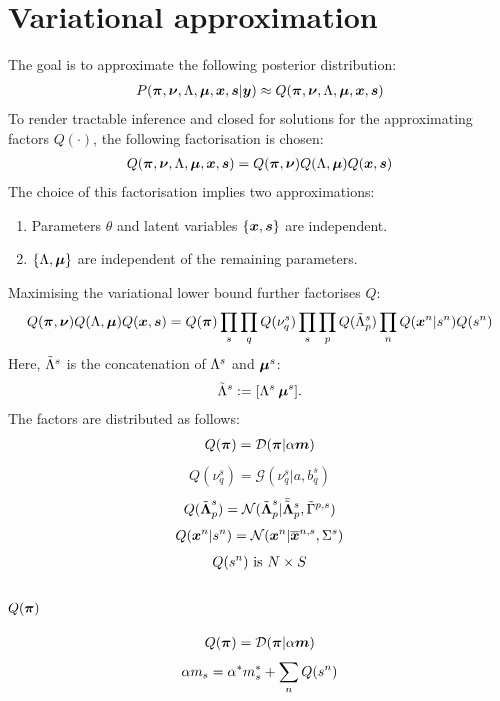 \documentclass[a4paper]{article}
\begin{document}
\section{Variational approximation}
The goal is to approximate the following posterior distribution:
\begin{align}
  P(\boldsymbol{\pi},\boldsymbol{\nu},\Lambda,\boldsymbol{\mu},\boldsymbol{x},\boldsymbol{s}|\boldsymbol{y}) \approx Q(\boldsymbol{\pi},\boldsymbol{\nu},\Lambda,\boldsymbol{\mu},\boldsymbol{x},\boldsymbol{s})
\end{align}
To render tractable inference and closed for solutions for the approximating factors $Q(\cdot)$, the following factorisation is chosen:
\begin{align}
  Q(\boldsymbol{\pi},\boldsymbol{\nu},\Lambda,\boldsymbol{\mu},\boldsymbol{x},\boldsymbol{s})=Q(\boldsymbol{\pi},\boldsymbol{\nu})Q(\Lambda,\boldsymbol{\mu})Q(\boldsymbol{x},\boldsymbol{s})
\end{align}
The choice of this factorisation implies two approximations:
\begin{enumerate}
  \item Parameters $\theta$ and latent variables $\left\{\boldsymbol{x},\boldsymbol{s}\right\}$ are independent.
  \item $\left\{\Lambda,\boldsymbol{\mu}\right\}$ are independent of the remaining parameters.
\end{enumerate}
Maximising the variational lower bound further factorises $Q$:
\begin{align}
  Q(\boldsymbol{\pi},\boldsymbol{\nu})Q(\Lambda,\boldsymbol{\mu})Q(\boldsymbol{x},\boldsymbol{s})=Q(\boldsymbol{\pi})\prod_s\prod_q Q(\nu_q^s)\prod_s\prod_p Q(\tilde{\Lambda}^s_p) \prod_n Q(\boldsymbol{x}^n|s^n)Q(s^n)
\end{align}
Here, $\tilde{\Lambda}^s$ is the concatenation of $\Lambda^s$ and $\boldsymbol{\mu}^s$:
\begin{align}
  \tilde{\Lambda}^s:=[\Lambda^s \: \boldsymbol{\mu}^s].
\end{align}
The factors are distributed as follows:
\begin{align}
  Q(\boldsymbol{\pi})=\mathcal{D}(\boldsymbol{\pi}|\alpha\boldsymbol{m})
\end{align}
\begin{align}
 Q(\nu^s_q)=\mathcal{G}(\nu^s_q|a, b_q^s)
\end{align}
\begin{align}
  Q(\tilde{\boldsymbol{\Lambda}}^s_p)=\mathcal{N}(\tilde{\boldsymbol{\Lambda}}^s_p|\bar{\tilde{\boldsymbol{\Lambda}}}^s_p,\tilde{\Gamma}^{p,s})
\end{align}
\begin{align}
  Q(\boldsymbol{x}^n|s^n)=\mathcal{N}(\boldsymbol{x}^n|\overline{\boldsymbol{x}}^{n,s},\Sigma^s)
\end{align}
\begin{align}
  Q(s^n)\text{ is }N\times S
\end{align}

\subsection{$Q(\boldsymbol{\pi})$}
\begin{align}
  Q(\boldsymbol{\pi})=\mathcal{D}(\boldsymbol{\pi}|\alpha\boldsymbol{m})
\end{align}
\begin{align}
  \alpha m_s=\alpha^*m^*_s+\sum_n Q(s^n)
\end{align}
\end{document}
